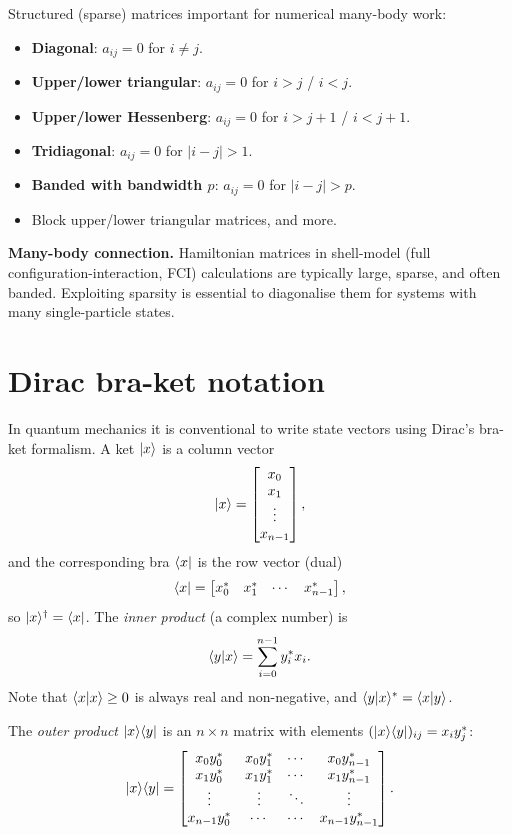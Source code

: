 Structured (sparse) matrices important for numerical many-body work:
\begin{itemize}
  \item \textbf{Diagonal}: $a_{ij}=0$ for $i\neq j$.
  \item \textbf{Upper/lower triangular}: $a_{ij}=0$ for $i>j$ / $i<j$.
  \item \textbf{Upper/lower Hessenberg}: $a_{ij}=0$ for $i>j+1$ / $i<j+1$.
  \item \textbf{Tridiagonal}: $a_{ij}=0$ for $|i-j|>1$.
  \item \textbf{Banded with bandwidth $p$}: $a_{ij}=0$ for $|i-j|>p$.
  \item Block upper/lower triangular matrices, and more.
\end{itemize}

\begin{notebox}
\textbf{Many-body connection.} Hamiltonian matrices in shell-model
(full configuration-interaction, FCI) calculations are typically large,
sparse, and often banded.  Exploiting sparsity is essential to
diagonalise them for systems with many single-particle states.
\end{notebox}

\section{Dirac bra-ket notation}
\label{sec:braket}

In quantum mechanics it is conventional to write state vectors using
Dirac's bra-ket formalism.  A ket $\vert x \rangle$ is a column vector
\[
  \vert x \rangle =
  \begin{bmatrix} x_0 \\ x_1 \\ \vdots \\ x_{n-1} \end{bmatrix},
\]
and the corresponding bra $\langle x \vert$ is the row vector (dual)
\[
  \langle x \vert =
  \begin{bmatrix} x_0^{*} & x_1^{*} & \cdots & x_{n-1}^{*} \end{bmatrix},
\]
so $\vert x \rangle^{\dagger}=\langle x \vert$.  The \emph{inner product}
(a complex number) is
\[
  \langle y \vert x \rangle = \sum_{i=0}^{n-1} y_i^{*} x_i.
\]
Note that $\langle x \vert x \rangle\geq 0$ is always real and non-negative,
and $\langle y \vert x \rangle^{*}=\langle x \vert y \rangle$.

The \emph{outer product} $\vert x \rangle\langle y \vert$ is an $n\times n$ matrix
with elements $(\vert x \rangle\langle y \vert)_{ij}=x_i y_j^{*}$:
\[
  \vert x \rangle\langle y \vert =
  \begin{bmatrix}
    x_0 y_0^{*} & x_0 y_1^{*} & \cdots & x_0 y_{n-1}^{*} \\
    x_1 y_0^{*} & x_1 y_1^{*} & \cdots & x_1 y_{n-1}^{*} \\
    \vdots      & \vdots      & \ddots & \vdots           \\
    x_{n-1}y_0^{*} & \cdots & \cdots & x_{n-1}y_{n-1}^{*}
  \end{bmatrix}.
\]

